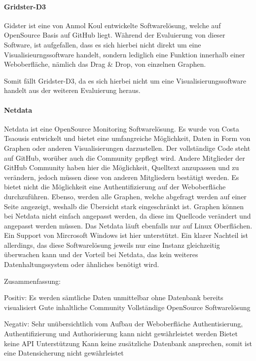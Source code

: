 \paragraph{Gridster-D3}
\label{paragraph:gridster-d3}
Gidster ist eine von Anmol Koul entwickelte Softwarelösung, welche auf
OpenSource Basis auf GitHub liegt. Während der Evaluierung von dieser Software,
ist aufgefallen, dass es sich hierbei nicht direkt um eine
Visualisieurngssoftware handelt, sondern lediglich eine Funktion innerhalb
einer Weboberfläche, nämlich das Drag \& Drop, von einzelnen Graphen.

Somit fällt Gridster-D3, da es sich hierbei nicht um eine
Visualisierungssoftware handelt aus der weiteren Evaluierung heraus.

\paragraph{Netdata}
\label{paragraph:netdata}
Netdata ist eine OpenSource Monitoring Softwarelösung. Es wurde von Costa
Tsaousis entwickelt und bietet eine umfangreiche Möglichkeit, Daten in Form von
Graphen oder anderen Visualisierungen darzustellen. Der vollständige Code steht
auf GitHub, worüber auch die Community gepflegt wird. Andere Mitglieder der
GitHub Community haben hier die Möglichkeit, Quelltext anzupassen und zu
verändern, jedoch müssen diese von anderen Mitgliedern bestätigt werden. Es
bietet nicht die Möglichkeit eine Authentifizierung auf der Weboberfläche
durchzuführen. Ebenso, werden alle Graphen, welche abgefragt werden auf einer
Seite angezeigt, weshalb die Übersicht stark eingeschränkt ist. Graphen können
bei Netdata nicht einfach angepasst werden, da diese im Quellcode verändert und
angepasst werden müssen. Das Netdata läuft ebenfalls nur auf Linux Oberflächen.
Ein Support von Mircrosoft Windows ist hier unterstützt. Ein klarer Nachteil
ist allerdings, das diese Softwarelösung jeweils nur eine Instanz gleichzeitig
überwachen kann und der Vorteil bei Netdata, das kein weiteres
Datenhaltungssystem oder ähnliches benötigt wird.

Zusammenfassung:
\begin{outline}
  Positiv:
  \1 Es werden sämtliche Daten unmittelbar ohne Datenbank bereits visualisiert
  \1 Gute inhaltliche Community
  \1 Vollständige OpenSource Softwarelösung

  Negativ:
  \1 Sehr unübersichtlich vom Aufbau der Weboberfläche
  \1 Authentisierung, Authentifizierung und Authorisierung kann nicht
  gewährleistet werden
  \1 Bietet keine API Unterstützung
  \1 Kann keine zusätzliche Datenbank ansprechen, somit ist eine Datensicherung
  nicht gewährleistet
\end{outline}
\mr%

